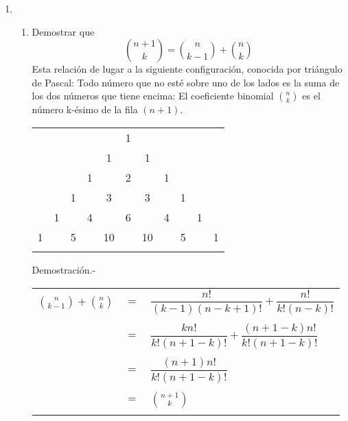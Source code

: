 \begin{enumerate}[\bfseries 1.]
      \item 
        \begin{enumerate}[\bfseries (a)]
          \item Demostrar que $${n +1 \choose k} = {n \choose k - 1} + {n \choose k}$$ Esta relación de lugar a la siguiente configuración, conocida por triángulo de Pascal: Todo número que no esté sobre uno de los lados es la suma de los dos números que tiene encima: El coeficiente binomial ${n \choose k}$ es el número k-ésimo de la fila $(n+1)$.
            \begin{center}
              \begin{tabular}{ccccccccccc}
                &    &    &    &    &  1 &    &    &    &    &   \\
                &    &    &    &  1 &    &  1 &    &    &    &   \\
                &    &    &  1 &    &  2 &    &  1 &    &    &   \\
                &    &  1 &    &  3 &    &  3 &    &  1 &    &   \\
                &  1 &    &  4 &    &  6 &    &  4 &    &  1 &   \\
              1 &    &  5 &    & 10 &    & 10 &    &  5 &    & 1 \\\\
              \end{tabular}
            \end{center}
          Demostración.- \; \\
            \begin{center}
              \begin{tabular}{r c l}
                $ {n \choose k-1}  +  {n \choose k} $&$=$&$\dfrac{n!}{(k-1)(n-k+1)!}+ \dfrac{n!}{k!(n-k)!}$\\\\
                &$=$&$\dfrac{kn!}{k!(n+1-k)!} + \dfrac{(n+1-k)n!}{k!(n+1-k)!}$\\\\
                &$=$&$\dfrac{(n+1)n!}{k!(n+1-k)!}$\\\\
                &$=$&$ {n+1 \choose k} $\\\\
              \end{tabular}
            \end{center}


\end{enumerate}
\end{enumerate}
